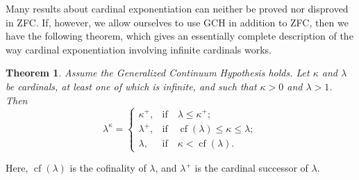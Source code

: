 \documentclass[12pt]{article}
\DeclareMathOperator{\cf}{cf}
\newtheorem*{thm*}{Theorem}
\begin{document}

Many results about cardinal exponentiation can neither be proved nor disproved in ZFC. If, however, we allow ourselves to use GCH in addition to ZFC, then we have the following theorem, which gives an essentially complete description of the way cardinal exponentiation involving infinite cardinals works.

\begin{thm*}
Assume the Generalized Continuum Hypothesis holds.
Let $\kappa$ and $\lambda$ be cardinals,
at least one of which is infinite,
and such that $\kappa>0$ and $\lambda>1$.
Then 
$$\lambda^\kappa=
\begin{cases}
\kappa^+,&\text{if}\quad\lambda\le\kappa^+;\\
\lambda^+,&\text{if}\quad\cf(\lambda)\le\kappa\le\lambda;\\
\lambda,&\text{if}\quad\kappa<\cf(\lambda).
\end{cases}$$
\end{thm*}

Here, $\cf(\lambda)$ is the cofinality of $\lambda$, and $\lambda^+$ is the cardinal successor of $\lambda$.
\end{document}
